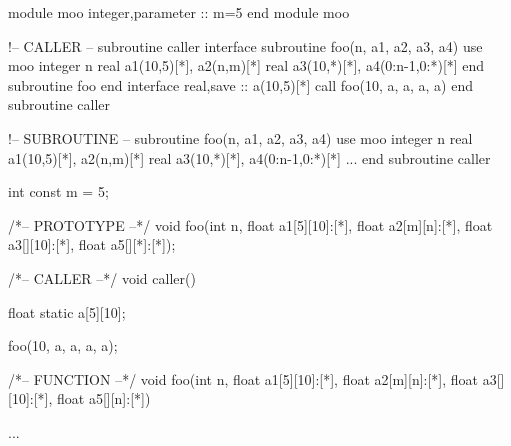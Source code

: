 \begin{center}
 \begin{minipage}{0.48\hsize}
  \begin{XFexample}
module moo
 integer,parameter :: m=5
end module moo

!-- CALLER --
subroutine caller
 interface
  subroutine foo(n, a1, a2, a3, a4)
   use moo
   integer n
   real a1(10,5)[*], a2(n,m)[*]
   real a3(10,*)[*], a4(0:n-1,0:*)[*]
  end subroutine foo
 end interface
 real,save :: a(10,5)[*]
 call foo(10, a, a, a, a)
end subroutine caller

!-- SUBROUTINE --
subroutine foo(n, a1, a2, a3, a4)
 use moo
 integer n
 real a1(10,5)[*], a2(n,m)[*]
 real a3(10,*)[*], a4(0:n-1,0:*)[*]
 ...
end subroutine caller
  \end{XFexample}
 \end{minipage}
%
 \begin{minipage}{0.48\hsize}
  \begin{XCexampleR}

int const m = 5;

/*-- PROTOTYPE --*/
void foo(int n,
         float a1[5][10]:[*],
         float a2[m][n]:[*],
         float a3[][10]:[*],
         float a5[][*]:[*]);

/*-- CALLER --*/
void caller() {
  float static a[5][10];

  foo(10, a, a, a, a);
}

/*-- FUNCTION --*/
void foo(int n,
         float a1[5][10]:[*],
         float a2[m][n]:[*],
         float a3[][10]:[*],
         float a5[][n]:[*]) {
  ...

}
  \end{XCexampleR}
 \end{minipage}
\end{center}
